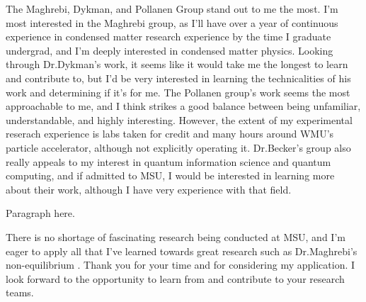 \documentclass[11pt]{article}
\newcommand{\schoolabbr}{MSU}
\begin{document}
The Maghrebi, Dykman, and Pollanen Group stand out to me the most. I'm most interested in the Maghrebi group, as I'll have over a year of continuous experience in condensed matter research experience by the time I graduate undergrad, and I'm deeply interested in condensed matter physics. Looking through Dr.\@ Dykman's work, it seems like it would take me the longest to learn and contribute to, but I'd be very interested in learning the technicalities of his work and determining if it's for me. The Pollanen group's work seems the most approachable to me, and I think strikes a good balance between being unfamiliar, understandable, and highly interesting. However, the extent of my experimental reserach experience is labs taken for credit and many hours around WMU's particle accelerator, although not explicitly operating it. Dr.\@ Becker's group also really appeals to my interest in quantum information science and quantum computing, and if admitted to MSU, I would be interested in learning more about their work, although I have very experience with that field.

Paragraph here.

There is no shortage of fascinating research being conducted at \schoolabbr{}, and I'm eager to apply all that I've learned towards great research such as Dr.\@ Maghrebi's non-equilibrium . Thank you for your time and for considering my application. I look forward to the opportunity to learn from and contribute to your research teams.
\end{document}
